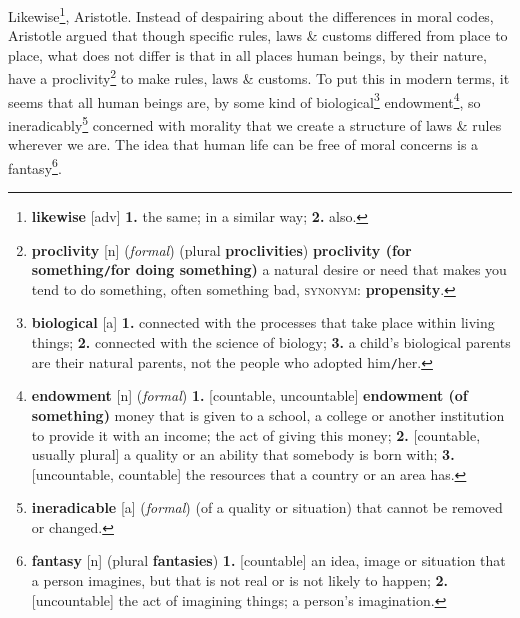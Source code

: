 \documentclass[oneside]{book}
\numberwithin{equation}{section}
\begin{document}
Likewise\footnote{\textbf{likewise} [adv] \textbf{1.} the same; in a similar way; \textbf{2.} also.}, Aristotle. Instead of despairing about the differences in moral codes, Aristotle argued that though specific rules, laws \& customs differed from place to place, what does not differ is that in all places human beings, by their nature, have a proclivity\footnote{\textbf{proclivity} [n] (\textit{formal}) (plural \textbf{proclivities}) \textbf{proclivity (for something\texttt{/}for doing something)} a natural desire or need that makes you tend to do something, often something bad, \textsc{synonym}: \textbf{propensity}.} to make rules, laws \& customs. To put this in modern terms, it seems that all human beings are, by some kind of biological\footnote{\textbf{biological} [a] \textbf{1.} connected with the processes that take place within living things; \textbf{2.} connected with the science of biology; \textbf{3.} a child's biological parents are their natural parents, not the people who adopted him\texttt{/}her.} endowment\footnote{\textbf{endowment} [n] (\textit{formal}) \textbf{1.} [countable, uncountable] \textbf{endowment (of something)} money that is given to a school, a college or another institution to provide it with an income; the act of giving this money; \textbf{2.} [countable, usually plural] a quality or an ability that somebody is born with; \textbf{3.} [uncountable, countable] the resources that a country or an area has.}, so ineradicably\footnote{\textbf{ineradicable} [a] (\textit{formal}) (of a quality or situation) that cannot be removed or changed.} concerned with morality that we create a structure of laws \& rules wherever we are. The idea that human life can be free of moral concerns is a fantasy\footnote{\textbf{fantasy} [n] (plural \textbf{fantasies}) \textbf{1.} [countable] an idea, image or situation that a person imagines, but that is not real or is not likely to happen; \textbf{2.} [uncountable] the act of imagining things; a person's imagination.}.
\end{document}
